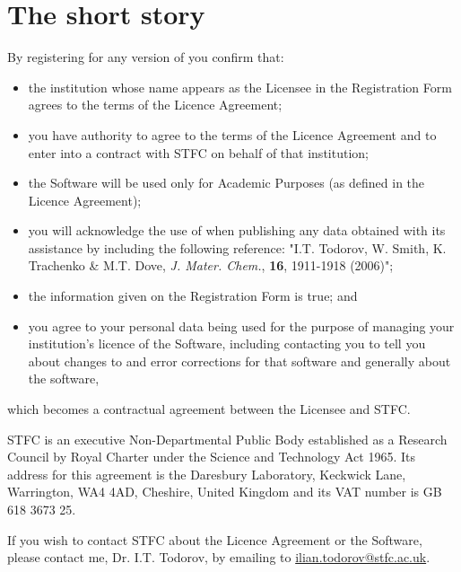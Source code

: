 \label{licence}
\section{The short story}

By registering for any version of \D you confirm that:
\begin{itemize}
\item the institution whose name appears as the Licensee in the Registration Form
agrees to the terms of the Licence Agreement;

\item you have authority to agree to the terms of the Licence Agreement and to
enter into a contract with STFC on behalf of that institution;

\item the \D Software will be used only for Academic Purposes (as defined
in the Licence Agreement);

\item you will acknowledge the use of \D when publishing any data obtained
with its assistance by including the following reference: "I.T. Todorov, W. Smith,
K. Trachenko \& M.T. Dove, {\em J. Mater. Chem.}, {\bf 16}, 1911-1918 (2006)";

\item the information given on the Registration Form is true; and

\item you agree to your personal data being used for the purpose of managing your
institution's licence of the \D Software, including contacting you to tell
you about changes to and error corrections for that software and generally about
the software,
\end{itemize}
which becomes a contractual agreement between the Licensee and STFC.

STFC is an executive Non-Departmental Public Body established as a Research Council
by Royal Charter under the Science and Technology Act 1965.  Its address for this
agreement is the Daresbury Laboratory, Keckwick Lane, Warrington, WA4 4AD, Cheshire,
United Kingdom and its VAT number is GB 618 3673 25.

If you wish to contact STFC about the Licence Agreement or the \D Software, please
contact me, Dr. I.T. Todorov, by emailing to {\href{mailto:ilian.todorov@stfc.ac.uk}{ilian.todorov@stfc.ac.uk}}.

